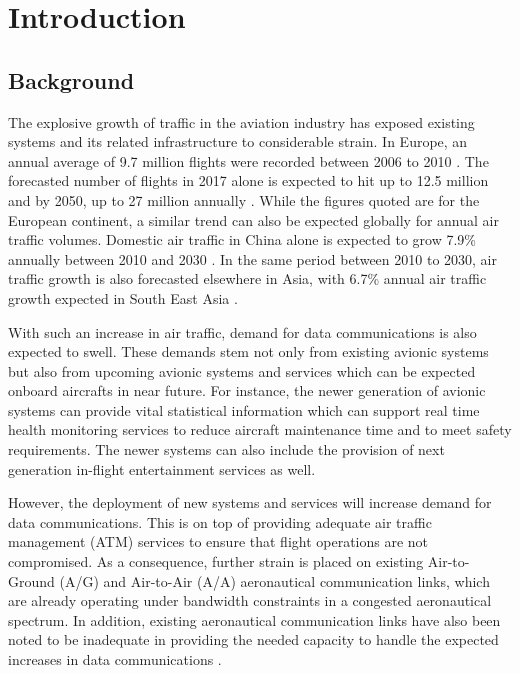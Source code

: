 \chapter{Introduction}
\label{chap:introduction}

\section{Background}
The explosive growth of traffic in the aviation industry has exposed existing systems and its related infrastructure to considerable strain. In Europe, an annual average of 9.7 million flights were recorded between 2006 to 2010 \cite{eurocontrol2011movements}. The forecasted number of flights in 2017 alone is expected to hit up to 12.5 million and by 2050, up to 27 million annually \cite{eurocontrol2013}. While the figures quoted are for the European continent, a similar trend can also be expected globally for annual air traffic volumes. Domestic air traffic in China alone is expected to grow 7.9\% annually between 2010 and 2030 \cite{secretariat2010icao}. In the same period between 2010 to 2030, air traffic growth is also forecasted elsewhere in Asia, with 6.7\% annual air traffic growth expected in South East Asia \cite{secretariat2010icao}.

With such an increase in air traffic, demand for data communications is also expected to swell. These demands stem not only from existing avionic systems but also from upcoming avionic systems and services which can be expected onboard aircrafts in near future. For instance, the newer generation of avionic systems can provide vital statistical information which can support real time health monitoring services to reduce aircraft maintenance time and to meet safety requirements. The newer systems can also include the provision of next generation in-flight entertainment services as well.

However, the deployment of new systems and services will increase demand for data communications. This is on top of providing adequate air traffic management (ATM) services to ensure that flight operations are not compromised. As a consequence, further strain is placed on existing Air-to-Ground (A/G) and Air-to-Air (A/A) aeronautical communication links, which are already operating under bandwidth constraints in a congested aeronautical spectrum. In addition, existing aeronautical communication links have also been noted to be inadequate in providing the needed capacity to handle the expected increases in data communications \cite{neji2013survey}. 

